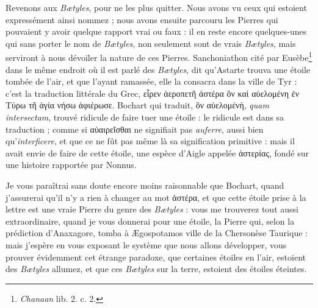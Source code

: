 \documentclass[a4paper, 11pt, oneside, polutonikogreek, french, landscape]{article}
\begin{document}
Revenons aux \emph{Bætyles}, pour ne les plus quitter. Nous avons vu ceux qui estoient expressément ainsi nommez ; nous avons ensuite parcouru les Pierres qui pouvaient y avoir quelque rapport vrai ou faux : il en reste encore quelques-unes qui sans porter le nom de \emph{Bætyles}, non seulement sont de vrais \emph{Bætyles}, mais serviront à nous dévoiler la nature de ces Pierres. Sanchoniathon cité par Eusèbe\footnote{\emph{Chanaan} lib. 2. c. 2.} dans le même endroit où il est parlé des \emph{Bætyles}, dit qu'Astarte trouva une étoile tombée de l'air, et que l'ayant ramassée, elle la consacra dans la ville de Tyr : c'est la traduction littérale du Grec, εἷρεν ἀεροπετῆ ἀστέρα ὃν καὶ αὐελομένη ἐν Τύρω τῆ ἁγία νήσω ἀφιέρωσε. Bochart qui traduit, ὃν αὐελομένὴ, \emph{quam intersectam}, trouvé ridicule de faire tuer une étoile : le ridicule est dans sa traduction ; comme si αὐαιρεῖσθαι ne signifiait pas \emph{auferre}, aussi bien qu'\emph{interficere}, et que ce ne fût pas même là sa signification primitive : mais il avait envie de faire de cette étoile, une espèce d'Aigle appelée ἀστερίας, fondé sur une histoire rapportée par Nonnus.

Je vous paraîtrai sans doute encore moins raisonnable que Bochart, quand j'assurerai qu'il n'y a rien à changer au mot ἀστέρα, et que cette étoile prise à la lettre est une vraie Pierre du genre des \emph{Bætyles} : vous me trouverez tout aussi extraordinaire, quand je vous donnerai pour une étoile, la Pierre qui, selon la prédiction d'Anaxagore, tomba à Ægospotamos ville de la Chersonèse Taurique : mais j'espère en vous exposant le système que nous allons développer, vous prouver évidemment cet étrange paradoxe, que certaines étoiles en l'air, estoient des \emph{Bætyles} allumez, et que ces \emph{Bætyles} sur la terre, estoient des étoiles éteintes.
\end{document}
